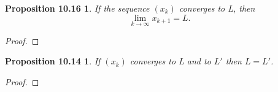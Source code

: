 \documentclass[12pt]{amsart}
\begin{document}
\newtheorem*{prop10.16}{Proposition 10.16}
\begin{prop10.16}
	If the sequence $(x_k)$ converges to L, then $$\lim_{k \to \infty} x_{k+1} = L.$$
\end{prop10.16}

\begin{proof}
\end{proof}

\newtheorem*{prop10.14}{Proposition 10.14}
\begin{prop10.14}
	If $(x_k)$ converges to L and to $L'$ then $L = L'$.
\end{prop10.14}

\begin{proof}
\end{proof}
\end{document}
